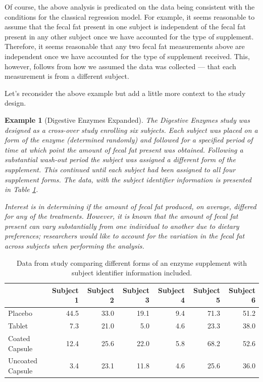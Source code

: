 \documentclass[
]{book}
\theoremstyle{plain}
\theoremstyle{mydefn}
\theoremstyle{myexmpl}
\newtheorem{example}{Example}[chapter]
\theoremstyle{remark}
\begin{document}
Of course, the above analysis is predicated on the data being consistent with the conditions for the classical regression model. For example, it seems reasonable to assume that the fecal fat present in one subject is independent of the fecal fat present in any other subject once we have accounted for the type of supplement. Therefore, it seems reasonable that any two fecal fat measurements above are independent once we have accounted for the type of supplement received. This, however, follows from how we assumed the data was collected --- that each measurement is from a different subject.

Let's reconsider the above example but add a little more context to the study design.

\begin{example}[Digestive Enzymes Expanded]
The \emph{Digestive Enzymes} study was designed as a cross-over study enrolling six subjects. Each subject was placed on a form of the enzyme (determined randomly) and followed for a specified period of time at which point the amount of fecal fat present was obtained. Following a substantial wash-out period the subject was assigned a different form of the supplement. This continued until each subject had been assigned to all four supplement forms. The data, with the subject identifier information is presented in Table \ref{tab:rm-enzyme-data-table-expanded}.

Interest is in determining if the amount of fecal fat produced, on average, differed for any of the treatments. However, it is known that the amount of fecal fat present can vary substantially from one individual to another due to dietary preferences; researchers would like to account for the variation in the fecal fat across subjects when performing the analysis.
\end{example}

\begin{table}

\caption{\label{tab:rm-enzyme-data-table-expanded}Data from study comparing different forms of an enzyme supplement with subject identifier information included.}
\centering
\begin{tabular}[t]{lrrrrrr}
\toprule
  & Subject 1 & Subject 2 & Subject 3 & Subject 4 & Subject 5 & Subject 6\\
\midrule
Placebo & 44.5 & 33.0 & 19.1 & 9.4 & 71.3 & 51.2\\
Tablet & 7.3 & 21.0 & 5.0 & 4.6 & 23.3 & 38.0\\
Coated Capsule & 12.4 & 25.6 & 22.0 & 5.8 & 68.2 & 52.6\\
Uncoated Capsule & 3.4 & 23.1 & 11.8 & 4.6 & 25.6 & 36.0\\
\bottomrule
\end{tabular}
\end{table}
\end{document}
